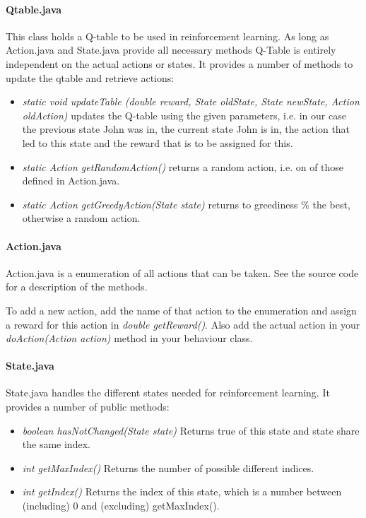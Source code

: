 \documentclass[a4paper,10pt]{scrartcl}
\begin{document}
\paragraph{Qtable.java}
This class holds a Q-table to be used in reinforcement learning. As long as Action.java and State.java provide all necessary methods Q-Table is entirely independent on the actual actions or states. It provides a number of methods to update the qtable and retrieve actions: \par
\begin{itemize}
 \item \textit{static void updateTable (double reward, State oldState, State newState, Action oldAction)} updates the Q-table using the given parameters, i.e. in our case the previous state John was in, the current state John is in, the action that led to this state and the reward that is to be assigned for this.
 \item \textit{static Action getRandomAction()} returns a random action, i.e. on of those defined in Action.java.
 \item \textit{static Action getGreedyAction(State state)} returns to  greediness \% the best, otherwise a random action.
\end{itemize}

\paragraph{Action.java}
Action.java is a enumeration of all actions that can be taken. See the source code for a description of the methods. \par

To add a new action, add the name of that action to the enumeration and assign a reward for this action in \textit{double getReward()}. Also add the actual action in your \textit{doAction(Action action)} method in your behaviour class.

\paragraph{State.java}
State.java handles the different states needed for reinforcement learning. It provides a number of public methods:
\begin{itemize}
 \item \textit{boolean hasNotChanged(State state)} Returns true of this state and state share the same index.
 \item \textit{int getMaxIndex()} Returns the number of possible different indices.
 \item \textit{int getIndex()} Returns the index of this state, which is a number between (including) 0 and (excluding) getMaxIndex().
\end{itemize} 
\end{document}
